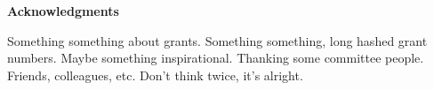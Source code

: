 \newpage
{}
\begin{center}
  \bf {Acknowledgments}
\end{center}

Something something about grants. Something something, long hashed grant numbers.
Maybe something inspirational. Thanking some committee people. Friends, colleagues, etc.
Don't think twice, it's alright.
